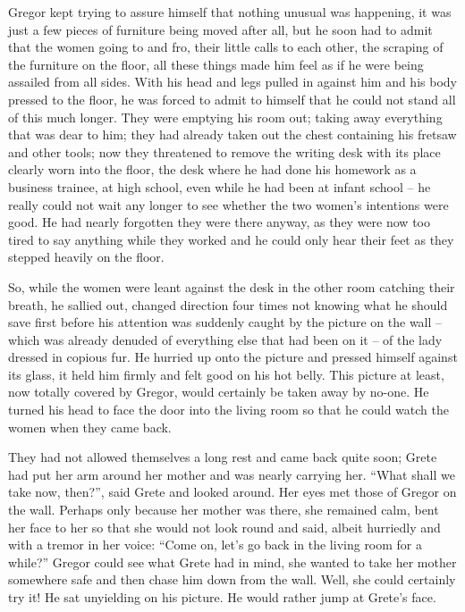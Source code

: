 Gregor kept trying to assure himself that nothing unusual was
happening, it was just a few pieces of furniture being moved after all,
but he soon had to admit that the women going to and fro, their little
calls to each other, the scraping of the furniture on the floor, all
these things made him feel as if he were being assailed from all sides.
With his head and legs pulled in against him and his body pressed to
the floor, he was forced to admit to himself that he could not stand
all of this much longer. They were emptying his room out; taking away
everything that was dear to him; they had already taken out the chest
containing his fretsaw and other tools; now they threatened to remove
the writing desk with its place clearly worn into the floor, the desk
where he had done his homework as a business trainee, at high school,
even while he had been at infant school – he really could not wait any
longer to see whether the two women’s intentions were good. He had
nearly forgotten they were there anyway, as they were now too tired to
say anything while they worked and he could only hear their feet as
they stepped heavily on the floor.

So, while the women were leant against the desk in the other room
catching their breath, he sallied out, changed direction four times not
knowing what he should save first before his attention was suddenly
caught by the picture on the wall – which was already denuded of
everything else that had been on it – of the lady dressed in copious fur.
He hurried up onto the picture and pressed himself against its glass,
it held him firmly and felt good on his hot belly. This picture at
least, now totally covered by Gregor, would certainly be taken away by
no-one. He turned his head to face the door into the living room so
that he could watch the women when they came back.

They had not allowed themselves a long rest and came back quite soon;
Grete had put her arm around her mother and was nearly carrying her.
“What shall we take now, then?”, said Grete and looked around. Her eyes
met those of Gregor on the wall. Perhaps only because her mother was
there, she remained calm, bent her face to her so that she would not
look round and said, albeit hurriedly and with a tremor in her voice:
“Come on, let’s go back in the living room for a while?” Gregor could
see what Grete had in mind, she wanted to take her mother somewhere
safe and then chase him down from the wall. Well, she could certainly
try it! He sat unyielding on his picture. He would rather jump at
Grete’s face.

